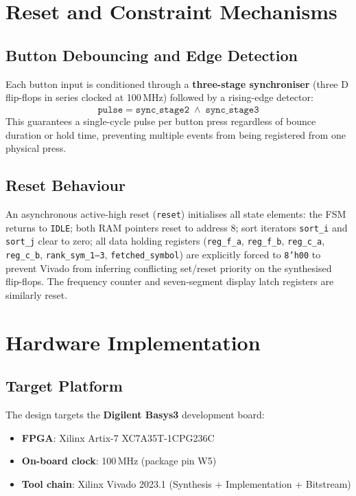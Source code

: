 \documentclass[12pt,a4paper]{article}
\begin{document}
\section{Reset and Constraint Mechanisms}

\subsection{Button Debouncing and Edge Detection}
Each button input is conditioned through a \textbf{three-stage synchroniser} (three
D flip-flops in series clocked at 100\,MHz) followed by a rising-edge detector:
\begin{equation}
  \texttt{pulse} = \texttt{sync\_stage2} \;\wedge\; \overline{\texttt{sync\_stage3}}
\end{equation}
This guarantees a single-cycle pulse per button press regardless of bounce duration or
hold time, preventing multiple events from being registered from one physical press.

\subsection{Reset Behaviour}
An asynchronous active-high reset (\texttt{reset}) initialises all state elements:
the FSM returns to \texttt{IDLE}; both RAM pointers reset to address 8; sort iterators
\texttt{sort\_i} and \texttt{sort\_j} clear to zero; all data holding registers
(\texttt{reg\_f\_a}, \texttt{reg\_f\_b}, \texttt{reg\_c\_a}, \texttt{reg\_c\_b},
\texttt{rank\_sym\_1--3}, \texttt{fetched\_symbol}) are explicitly forced to
\texttt{8'h00} to prevent Vivado from inferring conflicting set/reset priority on the
synthesised flip-flops. The frequency counter and seven-segment display latch registers
are similarly reset.

\section{Hardware Implementation}

\subsection{Target Platform}
The design targets the \textbf{Digilent Basys3} development board:
\begin{itemize}
  \item \textbf{FPGA}: Xilinx Artix-7 XC7A35T-1CPG236C
  \item \textbf{On-board clock}: 100\,MHz (package pin W5)
  \item \textbf{Tool chain}: Xilinx Vivado 2023.1 (Synthesis + Implementation +
        Bitstream)
\end{itemize}
\end{document}
